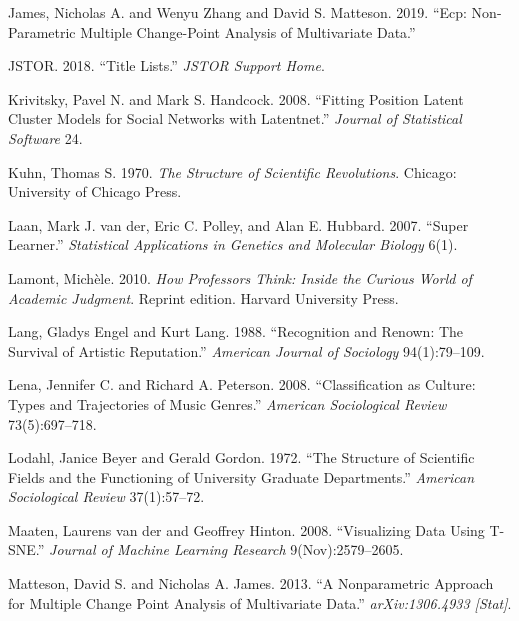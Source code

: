 \documentclass[]{book}
\theoremstyle{definition}
\theoremstyle{definition}
\theoremstyle{definition}
\theoremstyle{remark}
\begin{document}
\leavevmode\hypertarget{ref-James2019ecp}{}%
James, Nicholas A. and Wenyu Zhang and David S. Matteson. 2019. ``Ecp:
Non-Parametric Multiple Change-Point Analysis of Multivariate Data.''

\leavevmode\hypertarget{ref-JSTOR2018Title}{}%
JSTOR. 2018. ``Title Lists.'' \emph{JSTOR Support Home}.

\leavevmode\hypertarget{ref-Krivitsky2008Fitting}{}%
Krivitsky, Pavel N. and Mark S. Handcock. 2008. ``Fitting Position
Latent Cluster Models for Social Networks with Latentnet.''
\emph{Journal of Statistical Software} 24.

\leavevmode\hypertarget{ref-Kuhn1970Structure}{}%
Kuhn, Thomas S. 1970. \emph{The Structure of Scientific Revolutions}.
Chicago: University of Chicago Press.

\leavevmode\hypertarget{ref-vanderLaan2007Super}{}%
Laan, Mark J. van der, Eric C. Polley, and Alan E. Hubbard. 2007.
``Super Learner.'' \emph{Statistical Applications in Genetics and
Molecular Biology} 6(1).

\leavevmode\hypertarget{ref-Lamont2010How}{}%
Lamont, Michèle. 2010. \emph{How Professors Think: Inside the Curious
World of Academic Judgment}. Reprint edition. Harvard University Press.

\leavevmode\hypertarget{ref-Lang1988Recognition}{}%
Lang, Gladys Engel and Kurt Lang. 1988. ``Recognition and Renown: The
Survival of Artistic Reputation.'' \emph{American Journal of Sociology}
94(1):79--109.

\leavevmode\hypertarget{ref-Lena2008Classification}{}%
Lena, Jennifer C. and Richard A. Peterson. 2008. ``Classification as
Culture: Types and Trajectories of Music Genres.'' \emph{American
Sociological Review} 73(5):697--718.

\leavevmode\hypertarget{ref-Lodahl1972Structure}{}%
Lodahl, Janice Beyer and Gerald Gordon. 1972. ``The Structure of
Scientific Fields and the Functioning of University Graduate
Departments.'' \emph{American Sociological Review} 37(1):57--72.

\leavevmode\hypertarget{ref-Maaten2008Visualizing}{}%
Maaten, Laurens van der and Geoffrey Hinton. 2008. ``Visualizing Data
Using T-SNE.'' \emph{Journal of Machine Learning Research}
9(Nov):2579--2605.

\leavevmode\hypertarget{ref-Matteson2013Nonparametric}{}%
Matteson, David S. and Nicholas A. James. 2013. ``A Nonparametric
Approach for Multiple Change Point Analysis of Multivariate Data.''
\emph{arXiv:1306.4933 {[}Stat{]}}.
\end{document}

